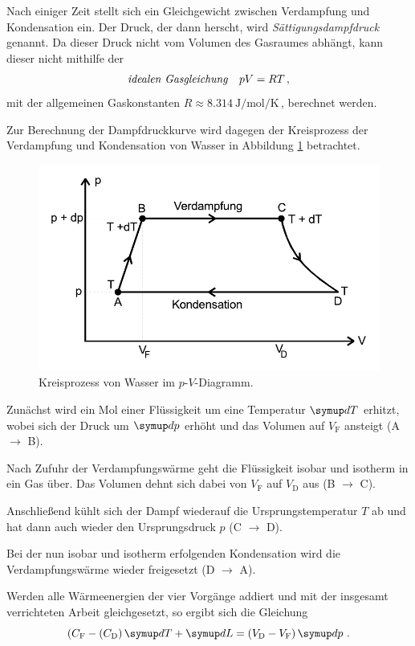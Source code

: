 Nach einiger Zeit stellt sich ein Gleichgewicht zwischen Verdampfung und Kondensation ein. 
Der Druck, der dann herscht, wird \textit{Sättigungsdampfdruck} genannt.
Da dieser Druck nicht vom Volumen des Gasraumes abhängt, kann dieser nicht mithilfe der
\begin{equation}
    \text{\textit{idealen~Gasgleichung}} \quad pV = RT  \, , \label{eq:idgasgleichung} 
\end{equation}
mit der allgemeinen Gaskonstanten $ R \approx \qty[per-mode=reciprocal]{8.314}{\joule\per\mol\per\kelvin} \,$, berechnet werden.

Zur Berechnung der Dampfdruckkurve wird dagegen der Kreisprozess der Verdampfung und Kondensation von Wasser
in Abbildung \ref{fig:kreisprozess} betrachtet.
\begin{figure} 
    \centering
    \includegraphics[width=12cm] {pictures/kreisprozess.pdf}  
    \caption{Kreisprozess von Wasser im $p$-$V$-Diagramm. \cite[3]{v203}}
    \label{fig:kreisprozess}
\end{figure}

Zunächst wird ein Mol einer Flüssigkeit um eine Temperatur $\dif{T}$ erhitzt, 
wobei sich der Druck um $\dif{p}$ erhöht und das Volumen auf $V_{\text{F}}$ ansteigt (A $\to$ B). 

Nach Zufuhr der Verdampfungswärme geht die Flüssigkeit isobar und isotherm in ein Gas über.
Das Volumen dehnt sich dabei von $V_{\text{F}}$ auf $V_{\text{D}}$ aus (B $\to$ C). 

Anschließend kühlt sich der Dampf wiederauf die Ursprungstemperatur $T$ ab 
und hat dann auch wieder den Ursprungsdruck $p$ (C $\to$ D).

Bei der nun isobar und isotherm erfolgenden Kondensation wird die Verdampfungswärme wieder freigesetzt (D $\to$ A).

Werden alle Wärmeenergien der vier Vorgänge addiert und mit der insgesamt verrichteten Arbeit gleichgesetzt,
so ergibt sich die Gleichung
\begin{equation}
    (C_\text{F} - (C_\text{D}) \dif{T} + \dif{L} = (V_\text{D} - V_\text{F}) \dif{p} \, .
\end{equation}

